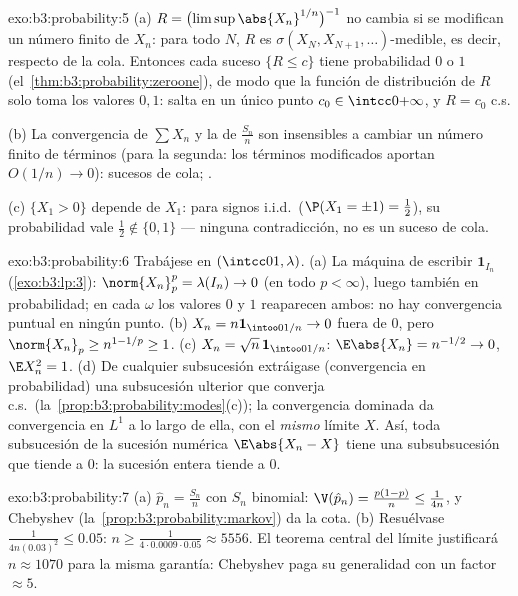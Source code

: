 \begin{solution}{exo:b3:probability:5}
(a) $R = \bigl(\limsup\abs{X_n}^{1/n}\bigr)^{-1}$ no cambia si se
modifican un número finito de $X_n$: para todo $N$, $R$ es
$\sigma(X_N, X_{N+1}, \dots)$-medible, es decir,
 respecto de la cola.
Entonces cada suceso $\{R \leq c\}$ tiene probabilidad $0$ o $1$
(el~\cref{thm:b3:probability:zeroone}), de modo que la función de
distribución de $R$ solo toma los valores $0, 1$: salta en un único
punto $c_0 \in
\intcc0{+\infty}$, y $R = c_0$ c.s.

(b) La convergencia de $\sum X_n$ y la de $\frac{S_n}n$ son insensibles
a cambiar un número finito de términos (para la segunda: los términos
modificados aportan $O(1/n) \to 0$): sucesos de cola;
.

(c) $\{X_1 > 0\}$ depende de $X_1$: para signos i.i.d.\
($\P(X_1 = \pm1) = \frac12$), su probabilidad vale $\frac12
\notin \{0,1\}$ --- ninguna contradicción, no es un suceso de cola.
\end{solution}

\begin{solution}{exo:b3:probability:6}
Trabájese en $(\intcc01, \lambda)$. (a) La máquina de escribir
$\mathbf 1_{I_n}$
(\cref{exo:b3:lp:3}): $\norm{X_n}_p^p = \lambda(I_n) \to 0$
(en todo $p < \infty$), luego también en probabilidad; en cada $\omega$
los valores $0$ y $1$ reaparecen ambos: no hay convergencia puntual en
ningún punto. (b) $X_n = n\mathbf 1_{\intoo0{1/n}} \to 0$ fuera de $0$,
pero
$\norm{X_n}_p \geq n^{1 - 1/p} \geq 1$.
(c) $X_n = \sqrt n\,\mathbf 1_{\intoo0{1/n}}$: $\E\abs{X_n} =
n^{-1/2} \to 0$, $\E X_n^2 = 1$.
(d) De cualquier subsucesión extráigase (convergencia en probabilidad)
una subsucesión ulterior que converja c.s.\
(la~\cref{prop:b3:probability:modes}(c)); la convergencia dominada da
convergencia en $L^1$ a lo largo de ella, con el \emph{mismo} límite
$X$. Así, toda subsucesión de la sucesión numérica $\E\abs{X_n - X}$
tiene una subsubsucesión que tiende a $0$: la sucesión entera tiende a
$0$.
\end{solution}

\begin{solution}{exo:b3:probability:7}
(a) $\hat p_n = \frac{S_n}n$ con $S_n$ binomial: $\V(\hat
p_n) = \frac{p(1-p)}n \leq \frac1{4n}$, y Chebyshev
(la~\cref{prop:b3:probability:markov}) da la cota. (b) Resuélvase
$\frac1{4n(0.03)^2} \leq 0.05$: $n \geq
\frac{1}{4\cdot0.0009\cdot0.05} \approx 5556$. El teorema central del
límite justificará $n \approx 1070$ para la misma garantía: Chebyshev
paga su generalidad con un factor
$\approx 5$.
\end{solution}

